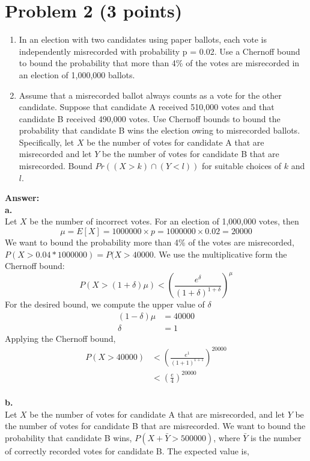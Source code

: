 \documentclass[letterpaper, 11pt]{article}
\begin{document}
\section*{Problem 2 (3 points)}
\begin{enumerate}
	\item In an election with two candidates using paper ballots, each vote is independently misrecorded with probability p = 0.02. Use a Chernoff bound to bound the probability that more than 4\% of the votes are misrecorded in an election of 1,000,000 ballots.
	\item Assume that a misrecorded ballot always counts as a vote for the other candidate. Suppose that candidate A received 510,000 votes and that candidate B received 490,000 votes. Use Chernoff bounds to bound the probability that candidate B wins the election owing to misrecorded ballots. Specifically, let $X$ be the number of votes for candidate A that are misrecorded and let $Y$ be the number of votes for candidate B that are misrecorded. Bound $Pr((X > k) \cap (Y < l))$ for suitable choices of $k$ and $l$. 
\end{enumerate}
\textbf{Answer:} \\
\textbf{a.} \\
Let $X$ be the number of incorrect votes. For an election of 1,000,000 votes, then
$$\mu = E[X]=1000000 \times p = 1000000 \times 0.02 = 20000$$
We want to bound the probability more than 4\% of the votes are misrecorded, $P(X> 0.04 * 1000000) = P(X>40000$. We use the multiplicative form the Chernoff bound:
$$P(X > (1+\delta)\mu) < \left(\frac{e^{\delta}}{(1+\delta)^{1+\delta}}\right)^\mu$$
For the desired bound, we compute the upper value of $\delta$
\begin{align*}
	(1-\delta)\mu &= 40000 \\
	\delta &= 1
\end{align*}
Applying the Chernoff bound,
\begin{align*}
	P(X>40000) &< \left(\frac{e^{1}}{(1+1)^{1+1}}\right)^{20000} \\
	&< \left(\frac{e}{4}\right)^{20000}
\end{align*}\\
\textbf{b.}\\
Let $X$ be the number of votes for candidate A that are misrecorded, and let $Y$ be the number of votes for candidate B that are misrecorded. We want to bound the probability that candidate B wins, $P(X + \bar Y > 500000)$, where $\bar Y$ is the number of correctly recorded votes for candidate B. The expected value is,
\end{document}
